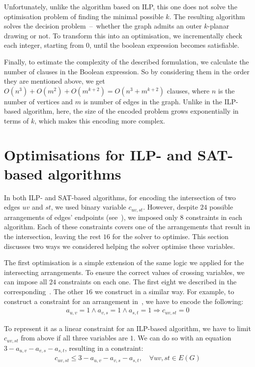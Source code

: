 Unfortunately, unlike the algorithm based on ILP, this one does not solve the optimisation problem of finding the minimal possible \(k\). The resulting algorithm solves the decision problem~--~whether the graph admits an outer \(k\)-planar drawing or not. To transform this into an optimisation, we incrementally check each integer, starting from \(0\), until the boolean expression becomes satisfiable.

Finally, to estimate the complexity of the described formulation, we calculate the number of clauses in the Boolean expression. So by considering them in the order they are mentioned above, we get \(O(n^3) + O(m^2) + O(m^{k+2}) = O(n^3 + m^{k+2})\) clauses, where \(n\) is the number of vertices and \(m\) is number of edges in the graph. Unlike in the ILP-based algorithm, here, the size of the encoded problem grows exponentially in terms of \(k\), which makes this encoding more complex.


\section{Optimisations for ILP- and SAT-based algorithms}\label{sec:optimisations}

In both ILP- and SAT-based algorithms, for encoding the intersection of two edges \(uv\) and \(st\), we used binary variable \(c_{uv, st}\). However, despite \(24\) possible arrangements of edges' endpoints (see~), we imposed only \(8\) constraints in each algorithm. Each of these constraints covers one of the arrangements that result in the intersection, leaving the rest \(16\) for the solver to optimise. This section discusses two ways we considered helping the solver optimise these variables.

The first optimisation is a simple extension of the same logic we applied for the intersecting arrangements. To ensure the correct values of crossing variables, we can impose all \(24\) constraints on each one. The first eight we described in the corresponding~. The other \(16\) we construct in a similar way. For example, to construct a constraint for an arrangement in~, we have to encode the following:
\begin{gather*}
    a_{u,v} = 1 \land a_{v,s} = 1 \land a_{s,t} = 1 \Longrightarrow c_{uv, st} = 0
\end{gather*}

To represent it as a linear constraint for an ILP-based algorithm, we have to limit \(c_{uv, st}\) from above if all three variables are \(1\). We can do so with an equation \(3 - a_{u,v} - a_{v,s} - a_{s,t}\), resulting in a constraint:
\begin{gather*}
    c_{uv, st} \leqslant 3 - a_{u,v} - a_{v,s} - a_{s,t},\quad\forall uv, st \in E(G)
\end{gather*}

